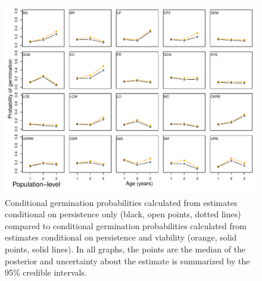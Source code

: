 \documentclass[12pt, oneside]{article}   	%
\begin{document}
 \begin{figure}[!h]
        \centering
        \includegraphics[page=2,width=\textwidth]{../../figures/compare-structured-germination2.pdf} 
            \caption{ Conditional germination probabilities calculated from estimates conditional on persistence only (black, open points, dotted lines) compared to conditional germination probabilities calculated from estimates conditional on persistence and viability (orange, solid points, solid lines). In all graphs, the points are the median of the posterior and uncertainty about the estimate is summarized by the 95\% credible intervals.  }
 \label{fig:germination-estimates-population}
\end{figure}

\end{document}
